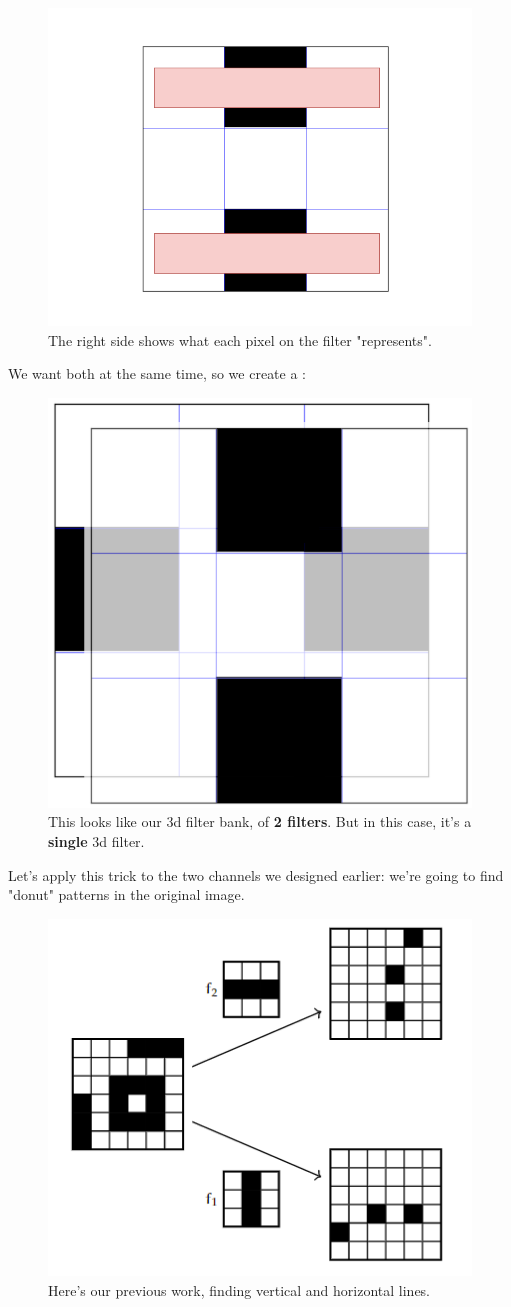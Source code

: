 \begin{figure}[ht]
\begin{minipage}{.45\textwidth}
              \includegraphics[width=.45\linewidth]{images/convolutional_neural_networks_images/filterbank_horizontal.png}
            \end{minipage}
            \caption*{The right side shows what each pixel on the filter "represents".}
        \end{figure}

        We want both at the same time, so we create a :

        \begin{figure}[H]
            \centering
            \includegraphics[width=.3\linewidth]{images/convolutional_neural_networks_images/filterbank_k2.png}
            \caption*{This looks like our 3d filter bank, of \textbf{2 filters}. But in this case, it's a \textbf{single} 3d filter.}
        \end{figure}

        Let's apply this trick to the two channels we designed earlier: we're going to find "donut" patterns in the original image.

        \begin{figure}[ht]
            \centering
            \includegraphics[width=.5\linewidth]{images/convolutional_neural_networks_images/two_channels.png}
            \caption*{Here's our previous work, finding vertical and horizontal lines.}
        \end{figure}

